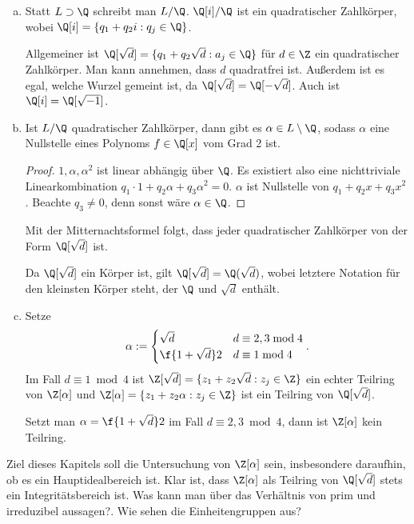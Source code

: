 \begin{ex} \label{4.3}
	\begin{enumerate}[a)]
		\item
			Statt $L \supset \Q$ schreibt man $L / \Q$.
			$\Q[i] / \Q$ ist ein quadratischer Zahlkörper, wobei $\Q[i] = \{ q_1 + q_2 i : q_j \in \Q \}$.

			Allgemeiner ist $\Q[\sqrt d] = \{ q_1 + q_2 \sqrt d : a_j \in \Q \}$ für $d \in \Z$ ein quadratischer Zahlkörper.
			Man kann annehmen, dass $d$ quadratfrei ist.
			Außerdem ist es egal, welche Wurzel gemeint ist, da $\Q[\sqrt d] = \Q[-\sqrt d]$.
			Auch ist $\Q[i] = \Q[\sqrt{-1}]$.
		\item
			Ist $L / \Q$ quadratischer Zahlkörper, dann gibt es $\alpha \in L \setminus \Q$, sodass $\alpha$ eine Nullstelle eines Polynoms $f \in \Q[x]$ vom Grad 2 ist.
			\begin{proof}
				$1, \alpha, \alpha^2$ ist linear abhängig über $\Q$.
				Es existiert also eine nichttriviale Linearkombination $q_1 \cdot 1 + q_2 \alpha + q_3 \alpha^2 = 0$.
				$\alpha$ ist Nullstelle von $q_1 + q_2 x + q_3 x^2$.
				Beachte $q_3 \neq 0$, denn sonst wäre $\alpha \in \Q$.
			\end{proof}
			Mit der Mitternachtsformel folgt, dass jeder quadratischer Zahlkörper von der Form $\Q[\sqrt d]$ ist.

			Da $\Q[\sqrt d]$ ein Körper ist, gilt $\Q[\sqrt d] = \Q(\sqrt d)$, wobei letztere Notation für den kleinsten Körper steht, der $\Q$ und $\sqrt{d}$ enthält.
		\item
			Setze
			\[
				\alpha := \begin{cases}
					\sqrt d & d \equiv 2, 3 \bmod 4 \\
					\f{1 + \sqrt d}2 & d \equiv 1 \bmod 4
				\end{cases}.
			\]
			Im Fall $d \equiv 1 \bmod 4$ ist $\Z[\sqrt d] = \{ z_1 + z_2 \sqrt{d} : z_j \in \Z \}$ ein echter Teilring von $\Z[\alpha]$ und $\Z[\alpha] = \{z_1 + z_2 \alpha : z_j \in \Z \}$ ist ein Teilring von $\Q[\sqrt d]$.

			Setzt man $\alpha = \f{1 + \sqrt d}2$ im Fall $d \equiv 2,3 \bmod 4$, dann ist $\Z[\alpha]$ kein Teilring.
	\end{enumerate}
\end{ex}

Ziel dieses Kapitels soll die Untersuchung von $\Z[\alpha]$ sein, insbesondere daraufhin, ob es ein Hauptidealbereich ist.
Klar ist, dass $\Z[\alpha]$ als Teilring von $\Q[\sqrt{d}]$ stets ein Integritätsbereich ist.
Was kann man über das Verhältnis von prim und irreduzibel aussagen?.
Wie sehen die Einheitengruppen aus?

